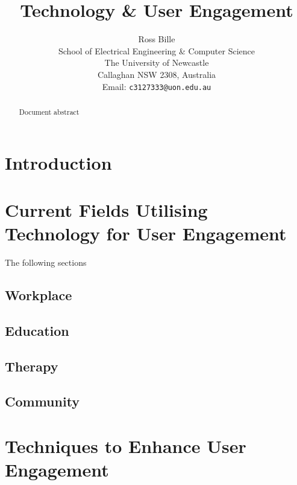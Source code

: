 \documentclass[a4paper,12pt]{article}
\begin{document}
%
\title{\bf Technology \& User Engagement}
%
\author{Ross Bille\\
School of Electrical Engineering \& Computer Science\\
The University of Newcastle\\ Callaghan NSW 2308, Australia\\
Email: \texttt{c3127333@uon.edu.au} } 
\maketitle


\newpage
\begin{abstract}%
\noindent Document abstract 
\end{abstract}

\pagebreak

\tableofcontents

\pagebreak

\listoffigures        

\pagebreak

\section{Introduction}


\section{Current Fields Utilising Technology for User Engagement}
The following sections 
\subsection{Workplace}
\subsection{Education}
\subsection{Therapy}
\subsection{Community}


\section{Techniques to Enhance User Engagement}
\end{document}
